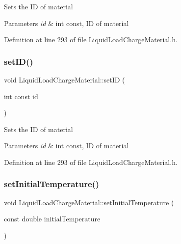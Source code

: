 Sets the ID of material 
\begin{DoxyParams}{Parameters}
{\em id} & int const, ID of material \\
\hline
\end{DoxyParams}


Definition at line 293 of file Liquid\+Load\+Charge\+Material.\+h.

\mbox{\label{class_liquid_load_charge_material_a192946f14996795396354f3e15b9e30b}} 
\subsubsection{\texorpdfstring{set\+I\+D()}{setID()}\hspace{0.1cm}{\footnotesize\ttfamily [3/3]}}
{\footnotesize\ttfamily void Liquid\+Load\+Charge\+Material\+::set\+ID (\begin{DoxyParamCaption}\item[{int const}]{id }\end{DoxyParamCaption})\hspace{0.3cm}{\ttfamily [inline]}}

Sets the ID of material 
\begin{DoxyParams}{Parameters}
{\em id} & int const, ID of material \\
\hline
\end{DoxyParams}


Definition at line 293 of file Liquid\+Load\+Charge\+Material.\+h.

\mbox{\label{class_liquid_load_charge_material_ac30600ef82db69934e8c08e4a774bb03}} 
\subsubsection{\texorpdfstring{set\+Initial\+Temperature()}{setInitialTemperature()}\hspace{0.1cm}{\footnotesize\ttfamily [1/3]}}
{\footnotesize\ttfamily void Liquid\+Load\+Charge\+Material\+::set\+Initial\+Temperature (\begin{DoxyParamCaption}\item[{const double}]{initial\+Temperature }\end{DoxyParamCaption})\hspace{0.3cm}{\ttfamily [inline]}}

